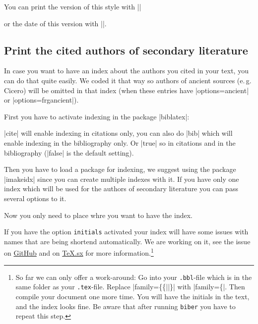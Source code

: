 \documentclass[a4paper,
10pt,
greek,
french,
spanish,
italian,
ngerman,
english,
]{ltxdoc}
\begin{document}
You can print the version of this style with |\archaeologieversion| 
\begin{example}
\archaeologieversion
\end{example}
or the date of this version with |\archaeologiedate|.
\begin{example}
\archaeologiedate
\end{example}

\subsection{Print the cited authors of secondary literature}
In case you want to have an index about the authors you cited in your text,
you can do that quite easily.
We coded it that way so authors of ancient sources (e.\,g. Cicero) will be omitted in that index (when these entries have |options={ancient}| or |options={frgancient}|).

First you have to activate indexing in the package |biblatex|:
\begin{code}
\usepackage[style=archaeologie,%
          indexing=cite,
          *@@*]{biblatex}
\end{code}
|cite| will enable indexing in citations only, 
you can also do |bib| which will enable indexing in the bibliography only.
Or |true| so in citations and in the bibliography (|false| is the default setting).

Then you have to load a package for indexing,
we suggest using the package |imakeidx| since you can create multiple indexes with it.
If you have only one index which will be used for the authors of secondary literature you can pass several options to it.
 \begin{code}
\usepackage{imakeidx}
\makeindex[%
  title=Index of  authors,
  columns=3,
]
\end{code}   

Now you only need to place  whre you want to have the index.
\begin{marker}
If you have the option \texttt{initials} activated your index will have some issues with names that are being shortend automatically.\label{initials:index}
We are working on it, see the issue on \href{https://github.com/LukasCBossert/biblatex-archaeologie/issues/97}{GitHub} and on \href{http://tex.stackexchange.com/q/330971/98739}{\TeX.sx} for more information.\footnote{So far we can only offer a work-around:
Go into your \texttt{.bbl}-file which is in the same folder as your \texttt{.tex}-file.
Replace |family=\{\{||\}| with |family=\{|.
Then compile your document one more time. You will have the initials in the text, 
and the index looks fine. 
Be aware that after running \texttt{biber} you have to repeat this step.}
\end{marker}
\end{document}
